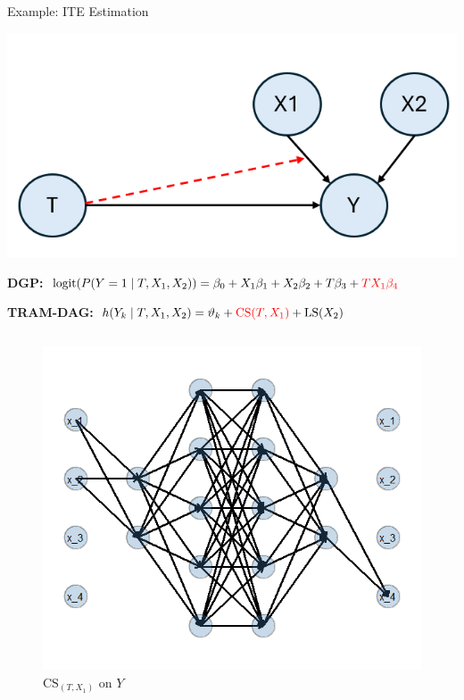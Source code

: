 \documentclass[onlytextwidth,english]{beamer}\usepackage[]{graphicx}\usepackage[]{xcolor}
\begin{document}
\begin{frame}{Example: ITE Estimation}


\centering
\includegraphics[width=0.3\linewidth]{img/ITE_DAG.png}

% 
\scriptsize

\vspace{0.2cm}
\textbf{DGP:} \quad
$\text{logit}(P(Y=1 \mid T, X_1, X_2)) = \beta_0 + X_1 \beta_1 + X_2 \beta_2 + T \beta_3 + \textcolor{red}{T X_1\beta_4}$

\vspace{0.2cm}

\textbf{TRAM-DAG:} \quad
$h(Y_k \mid T, X_1, X_2) = \vartheta_k + \textcolor{red}{\text{CS}(T, X_1)} + \text{LS}(X_2)$




\vspace{-0.1cm}

\begin{columns}

\begin{column}{0.48\textwidth}
\begin{figure}
  \centering
  \includegraphics[width=0.7\linewidth]{img/NN_CS_T_X1.png}
  \caption{$\text{CS}_{(T, X_1)}$ on $Y$}
\end{figure}
\end{column}


\end{columns}
\end{frame}
\end{document}
